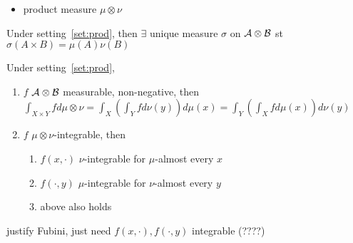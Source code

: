 \begin{itemize}
    \item product measure $\mu \otimes \nu$
\end{itemize}

\begin{prop}
    Under setting~\ref{set:prod}, then $\exists$ unique measure $\sigma$ on $\mathcal{A} \otimes \mathcal{B}$ st $\sigma(A \times B) = \mu(A)\nu(B)$
\end{prop}

\begin{thm}
    Under setting~\ref{set:prod},
    \begin{enumerate}
        \item $f$ $\mathcal{A} \otimes \mathcal{B}$ measurable, non-negative, then $\int_{X \times Y} f d\mu \otimes \nu = \int_X \left( \int_Y f d\nu(y) \right) d\mu(x) = \int_Y \left( \int_X f d\mu(x) \right) d\nu(y)$
        \item $f$ $\mu \otimes \nu$-integrable, then
        \begin{enumerate}
            \item $f(x, \cdot)$ $\nu$-integrable for $\mu$-almost every $x$
            \item $f(\cdot, y)$ $\mu$-integrable for $\nu$-almost every $y$
            \item above also holds
        \end{enumerate}
    \end{enumerate}
\end{thm}

\begin{fact}
    justify Fubini, just need $f(x, \cdot), f(\cdot, y)$ integrable (????)
\end{fact}